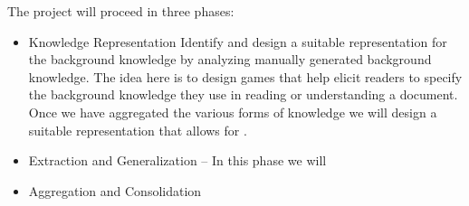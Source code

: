 The project will proceed in three phases:
\begin{itemize}
\item Knowledge Representation
Identify and design a suitable representation for the background knowledge by analyzing manually generated background knowledge. The idea here is to design games that help elicit readers to specify the background knowledge they use in reading or understanding a document. 
Once we have aggregated the various forms of knowledge we will design a suitable representation that allows for . 

\item Extraction and Generalization -- In this phase we will 

\item Aggregation and Consolidation


\end{itemize}